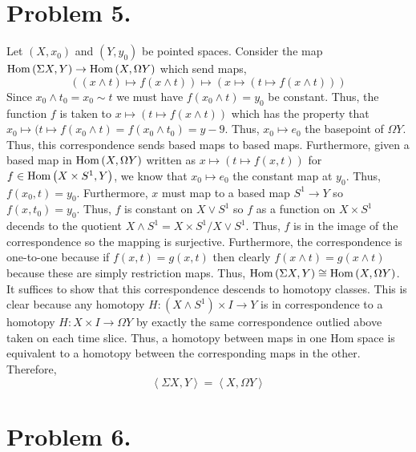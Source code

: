 \documentclass[12pt]{extarticle}
\begin{document}
\section*{Problem 5.}
Let $(X, x_0)$ and $(Y, y_0)$ be pointed spaces.
Consider the map $\mathrm{Hom}\left( \Sigma X, Y \right) \to \mathrm{Hom}\left( X, \Omega Y \right)$ which send maps,
\[ ((x \wedge t) \mapsto f(x \wedge t)) \mapsto (x \mapsto ( t \mapsto f(x \wedge t))) \] 
Since $x_0 \wedge t_0 = x_0 \sim t$ we must have $f(x_0 \wedge t) = y_0$ be constant. Thus, the function $f$ is taken to $x \mapsto ( t \mapsto f(x \wedge t))$ which has the property that $x_0 \mapsto (t \mapsto f(x_0 \wedge t) = f(x_0 \wedge t_0) = y-9$. Thus, $x_0 \mapsto e_0$ the basepoint of $\Omega Y$. Thus, this correspondence sends based maps to based maps. Furthermore, given a based map in $\mathrm{Hom}\left( X, \Omega Y \right)$ written as $x \mapsto (t \mapsto f(x, t))$ for $f \in \mathrm{Hom}\left( X \times S^1, Y \right)$, we know that $x_0 \mapsto e_0$ the constant map at $y_0$. Thus, $f(x_0, t) = y_0$. Furthermore, $x$ must map to a based map $S^1 \to Y$ so $f(x, t_0) = y_0$. Thus, $f$ is constant on $X \vee S^1$ so $f$ as a function on $X \times S^1$ decends to the quotient $X \wedge S^1 = X \times S^1 / X \vee S^1$. Thus, $f$ is in the image of the correspondence so the mapping is surjective. Furthermore, the correspondence is one-to-one because if $f(x, t) = g(x, t)$ then clearly  
$f(x \wedge t) = g(x \wedge t)$ because these are simply restriction maps. Thus, $\mathrm{Hom}\left( \Sigma X, Y \right) \cong \mathrm{Hom}\left( X, \Omega Y \right)$. It suffices to show that this correspondence descends to homotopy classes. This is clear because any homotopy $H : (X \wedge S^1) \times I \to Y$ is in correspondence to a homotopy $H : X \times I \to \Omega Y$ by exactly the same correspondence outlied above taken on each time slice. Thus, a homotopy between maps in one Hom space is equivalent to a homotopy between the corresponding maps in the other. Therefore, 
\[ \left< \Sigma X, Y \right> = \left<X, \Omega Y \right> \] 

\section*{Problem 6.}
\end{document}
